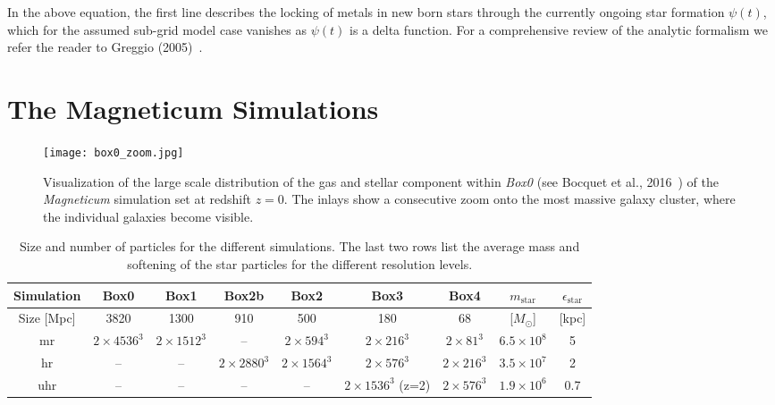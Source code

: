 \documentclass[galaxies,letter,accept,moreauthors,pdftex,10pt,a4paper,usenatbib]{mdpi}
\begin{document}
In the above equation, the first line describes the locking of
metals in new born stars through the currently ongoing star formation
$\psi(t)$, which for the assumed sub-grid model case vanishes as $\psi(t)$ is a delta function.
For a comprehensive review of the analytic formalism we refer the reader to Greggio (2005)~\cite{Greggio2005}.

\section{The Magneticum Simulations}
\begin{figure}[t]
\begin{center}
  \texttt{[image: box0\_zoom.jpg]}
  \caption{Visualization of the large scale distribution of the gas
    and stellar component within {\it Box0} (see Bocquet et al.,
    2016~\cite{2016MNRAS.456.2361B}) of the {\it Magneticum}
    simulation set at redshift $z=0$. The inlays show a consecutive
    zoom onto the most massive galaxy cluster, where the individual
    galaxies become visible.  }
   \label{fig1}
\end{center}
\end{figure}

\begin{table*}
\label{tab:Boxes}
\centering
\begin{tabular}{|c c c c c c c | c c | } 
\hline
Simulation   & Box0            & Box1            & Box2b          & Box2            & Box3           & Box4          & $m_\mathrm{star}$& $\epsilon_\mathrm{star}$ \\
\hline
Size [Mpc]   & 3820            & 1300            & 910            & 500             & 180            & 68            & [$M_\odot$]      & [kpc] \\
\hline
mr           & $2\times4536^3$ & $2\times1512^3$ & --              & $2\times594^3$  & $2\times216^3$ & $2\times81^3$ & $6.5\times10^8$           & 5\\
hr           & --              & --              & $2\times2880^3$ & $2\times1564^3$ & $2\times576^3$ & $2\times216^3$ & $3.5\times10^7$          & 2\\
uhr          & --              & --              & --              & --             & $2\times1536^3$ (z=2) & $2\times576^3$ & $1.9\times10^6$           & 0.7\\
\hline
\end{tabular}
\caption{Size and number of particles for the different simulations. The last two rows list the average mass and softening of the star particles for the different resolution levels.}
\label{tab1}
\end{table*}
\end{document}
